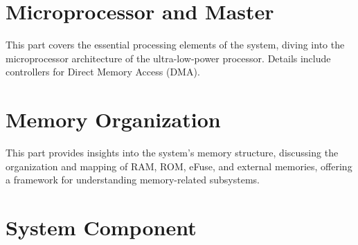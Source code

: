 \documentclass[openany, 10pt]{book}
\begin{document}
\setenglishformatting




\clearpage

\clearpage


\tableofcontents
\clearpage
\listoftables
\clearpage
\listoffigures





\part{Microprocessor and Master}


This part covers the essential processing elements of the system, diving into the microprocessor architecture of the ultra-low-power processor. Details include controllers for Direct Memory Access (DMA).


\part{Memory Organization}

This part provides insights into the system's memory structure, discussing the organization and mapping of RAM, ROM, eFuse, and external memories, offering a framework for understanding memory-related subsystems.


\part{System Component}
\end{document}
